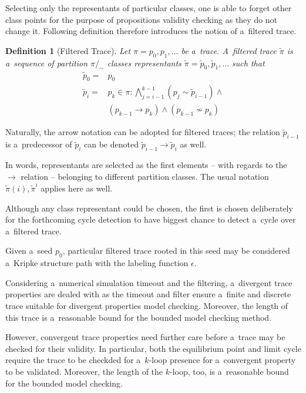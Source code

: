 \documentclass[12pt,oneside,draft]{fithesis}
\newtheorem{mydef}{Definition}
\begin{document}
Selecting only the representants of particular classes, one is able to
forget other class points for the purpose of propositions validity
checking as they do not change it. Following definition therefore
introduces the notion of a~filtered trace.
\begin{mydef}[Filtered Trace] Let $\pi=p_0,p_1,\dotsc$ be a~trace.
A~filtered trace $\tilde{\pi}$ is a~sequence of partition
$\pi/_{\sim}$ classes representants
$\tilde{\pi}=\tilde{p}_0,\tilde{p}_1,\dotsc$ such that
\begin{align}
\tilde{p}_{0}=&p_0\\
\tilde{p}_{i}=&p_k\in\pi:\bigwedge_{j=i-1}^{k-1}\left(
	p_j\sim \tilde{p}_{i-1}\right)
	\wedge\nonumber\\
	&(p_{k-1}\rightarrow p_{k})\wedge(p_{k-1}\not\sim p_{k})
\end{align}
\end{mydef}
Naturally, the arrow notation can be adopted for filtered traces;
the relation $\tilde{p}_{i-1}$ is a~predecessor of $\tilde{p}_{i}$ can
be denoted $\tilde{p}_{i-1}\rightarrow\tilde{p}_{i}$ as well.

In words, representants are selected as the first elements -- with
regards to the $\rightarrow$ relation -- belonging to different
partition classes. The usual notation $\tilde{\pi}(i),\tilde{\pi}^i$
applies here as well.

Although any class representant could be chosen, the first is chosen
deliberately for the forthcoming cycle detection to have biggest chance
to detect a~cycle over a~filtered trace.

Given a~seed $p_0$, particular filtered trace rooted in this seed may be
considered a~Kripke structure path with the labeling function
$\epsilon$.

Considering a~numerical simulation timeout and the filtering,
a~divergent trace properties are dealed with as the timeout and filter
ensure a~finite and discrete trace suitable for divergent properties
model checking. Moreover, the length of this trace is a~reasonable bound
for the bounded model checking method\cite{biere}.

However, convergent trace properties need further care before a~trace
may be checked for their validity. In particular, both the equilibrium
point and limit cycle require the trace to be checkded for a~$k$-loop
presence for a~convergent property to be validated. Moreover, the length
of the $k$-loop, too, is a~reasonable bound for the bounded model
checking\cite{biere}.
\end{document}
